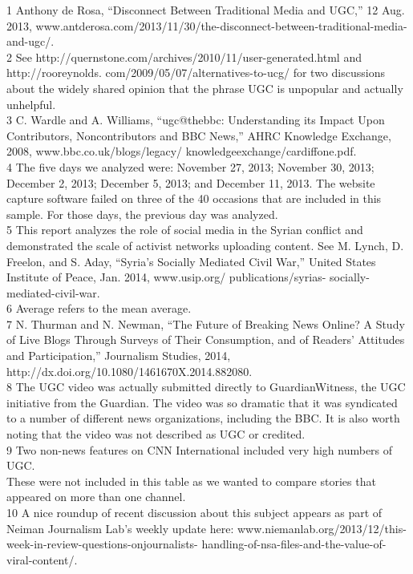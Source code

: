 \begin{enumerate}
1 Anthony de Rosa, ``Disconnect Between Traditional Media and UGC,'' 12 Aug. 2013,
www.antderosa.com/2013/11/30/the-disconnect-between-traditional-media-and-ugc/. \\
2 See http://quernstone.com/archives/2010/11/user-generated.html and http://rooreynolds.
com/2009/05/07/alternatives-to-ucg/ for two discussions about the widely shared opinion that
the phrase UGC is unpopular and actually unhelpful. \\
3 C. Wardle and A. Williams, ``ugc@thebbc: Understanding its Impact Upon Contributors, Noncontributors
and BBC News,'' AHRC Knowledge Exchange, 2008, www.bbc.co.uk/blogs/legacy/
knowledgeexchange/cardiffone.pdf.\\
4 The five days we analyzed were: November 27, 2013; November 30, 2013; December 2, 2013;
December 5, 2013; and December 11, 2013. The website capture software failed on three of the 40
occasions that are included in this sample. For those days, the previous day was analyzed.\\
5 This report analyzes the role of social media in the Syrian conflict and demonstrated the scale
of activist networks uploading content. See M. Lynch, D. Freelon, and S. Aday, ``Syria's Socially
Mediated Civil War,'' United States Institute of Peace, Jan. 2014, www.usip.org/ publications/syrias-
socially-mediated-civil-war.\\
6 Average refers to the mean average.\\
7 N. Thurman and N. Newman, ``The Future of Breaking News Online? A Study of Live Blogs
Through Surveys of Their Consumption, and of Readers' Attitudes and Participation,'' Journalism
Studies, 2014, http://dx.doi.org/10.1080/1461670X.2014.882080.\\
8 The UGC video was actually submitted directly to GuardianWitness, the UGC initiative from
the Guardian. The video was so dramatic that it was syndicated to a number of different news
organizations, including the BBC. It is also worth noting that the video was not described as UGC
or credited.\\
9 Two non-news features on CNN International included very high numbers of UGC.\\
These were not included in this table as we wanted to compare stories that appeared on more
than one channel.\\
10 A nice roundup of recent discussion about this subject appears as part of Neiman Journalism
Lab's weekly update here: www.niemanlab.org/2013/12/this-week-in-review-questions-onjournalists-
handling-of-nsa-files-and-the-value-of-viral-content/.\\

\end{enumerate}
